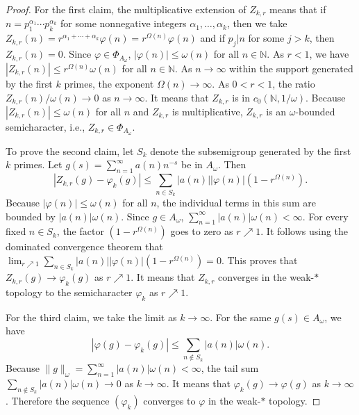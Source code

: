 \documentclass{amsart}
\theoremstyle{definition}
\theoremstyle{remark}
\numberwithin{equation}{section}
\begin{document}
\begin{proof}
For the first claim, the multiplicative extension of $Z_{k,r}$ means that if $n=p_1^{\alpha_1}\cdots p_k^{\alpha_k}$ for some nonnegative integers $\alpha_1, \ldots, \alpha_k$, then we take $Z_{k,r}(n) = r^{\alpha_1+\cdots+\alpha_k}\varphi(n) = r^{\Omega(n)}\varphi(n)$ and if $p_j|n$ for some $j>k$, then $Z_{k,r}(n)=0$. Since $\varphi \in \Phi_{A_\omega}$, $|\varphi(n)| \leq \omega(n)$ for all $n\in \mathbb N$. As $r < 1$, we have $|Z_{k,r}(n)| \leq r^{\Omega(n)} \omega(n)$ for all $n \in \mathbb N$. As $n \to \infty$ within the support generated by the first $k$ primes, the exponent $\Omega(n) \to \infty$. As $0<r<1$, the ratio $Z_{k,r}(n) / \omega(n)\to 0$ as $n\to \infty$. It means that $Z_{k,r}$ is in $c_0(\mathbb N, 1/\omega)$. Because $|Z_{k,r}(n)| \leq \omega(n)$ for all $n$ and $Z_{k,r}$ is multiplicative, $Z_{k,r}$ is an $\omega$-bounded semicharacter, i.e., $Z_{k,r}\in \Phi_{A_\omega}$.

To prove the second claim, let $S_k$ denote the subsemigroup generated by the first $k$ primes. Let $g(s) = \sum_{n=1}^\infty a(n) n^{-s}$ be in $A_\omega$. Then
$$|Z_{k,r}(g) - \varphi_k(g)| \leq \sum_{n \in S_k} |a(n)| |\varphi(n)| (1 - r^{\Omega(n)}).$$
Because $|\varphi(n)| \leq \omega(n)$ for all $n$, the individual terms in this sum are bounded by $|a(n)| \omega(n)$. Since $g \in A_\omega$, $\sum_{n=1}^\infty |a(n)| \omega(n)<\infty$. For every fixed $n \in S_k$, the factor $(1 - r^{\Omega(n)})$ goes to zero as $r \nearrow 1$. It follows using the dominated convergence theorem that $\lim_{r\nearrow 1}\sum_{n \in S_k} |a(n)| |\varphi(n)| (1 - r^{\Omega(n)})=0$. This proves that $Z_{k,r}(g) \to \varphi_k(g)$ as $r\nearrow 1$. It means that $Z_{k,r}$ converges in the weak-$\ast$ topology to the semicharacter $\varphi_k$ as $r\nearrow 1$.

For the third claim, we take the limit as $k \to \infty$. For the same $g(s) \in A_\omega$, we have
$$|\varphi(g) - \varphi_k(g)| \leq \sum_{n \notin S_k} |a(n)| \omega(n).$$
Because $\|g\|_\omega=\sum_{n=1}^\infty|a(n)|\omega(n)<\infty$, the tail sum $\sum_{n \notin S_k} |a(n)| \omega(n) \to 0$ as $k \to \infty$. It means that $\varphi_k(g) \to \varphi(g)$ as $k\to \infty$. Therefore the sequence $(\varphi_k)$ converges to $\varphi$ in the weak-$\ast$ topology.
\end{proof}
\end{document}
